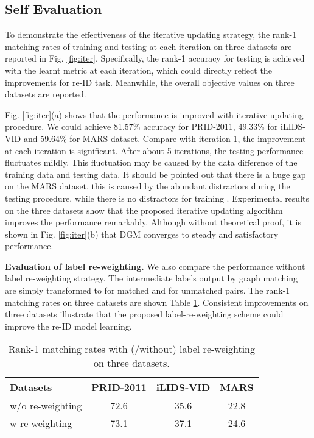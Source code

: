 \documentclass[10pt,twocolumn,letterpaper]{article}
\begin{document}
\subsection{Self Evaluation}\label{sec:self}

To demonstrate the effectiveness of the iterative updating strategy, the rank-1 matching rates of training and testing at each iteration on three datasets are reported in Fig. \ref{fig:iter}. Specifically, the rank-1 accuracy for testing is achieved with the learnt metric at each iteration, which could directly reflect the improvements for re-ID task. Meanwhile, the overall objective values on three datasets are reported.

Fig. \ref{fig:iter}(a) shows that the performance is improved with iterative updating procedure. We could achieve 81.57\% accuracy for PRID-2011, 49.33\% for iLIDS-VID and 59.64\% for MARS dataset. Compare with iteration 1, the improvement at each iteration is significant. After about 5 iterations, the testing performance fluctuates mildly. This fluctuation may be caused by the data difference of the training data and testing data. It should be pointed out that there is a huge gap on the MARS dataset, this is caused by the abundant distractors during the testing procedure, while there is no distractors for training \cite{eccv16mars}.
Experimental results on the three datasets show that the proposed iterative updating algorithm improves the performance remarkably. Although without theoretical proof, it is shown in Fig. \ref{fig:iter}(b) that DGM converges to steady and satisfactory performance.

\textbf{Evaluation of label re-weighting.}
We also compare the performance without label re-weighting strategy. The intermediate labels output by graph matching are simply transformed to  for matched and  for unmatched pairs. The rank-1 matching rates on three datasets are shown Table \ref{tab:reweigh}. Consistent improvements on three datasets illustrate that the proposed label-re-weighting scheme could improve the re-ID model learning.  \begin{table}[t]\small
\centering
  \begin{tabular*}{\columnwidth}{l|ccc}
  \hline
   Datasets & PRID-2011  &iLIDS-VID  & MARS    \\\hline
  w/o re-weighting  & 72.6     &35.6  & 22.8 \\
  w re-weighting    & 73.1  &37.1   & 24.6   \\ \hline
 \end{tabular*}
 \caption{\label{tab:reweigh}\small{Rank-1 matching rates with (/without) label re-weighting on three datasets.}}
\end{table}
\end{document}
